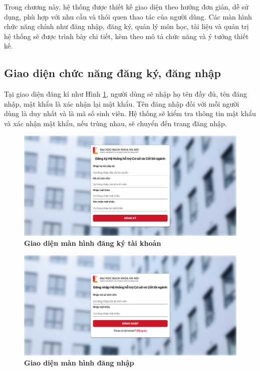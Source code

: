 \documentclass{article}
\begin{document}
	 Trong chương này, hệ thống được thiết kế giao diện theo hướng đơn giản, dễ sử dụng, phù hợp với nhu cầu và thói quen thao tác của người dùng. Các màn hình chức năng chính như đăng nhập, đăng ký, quản lý môn học, tài liệu và quản trị hệ thống sẽ được trình bày chi tiết, kèm theo mô tả chức năng và ý tưởng thiết kế.
	 
	 \subsection{Giao diện chức năng đăng ký, đăng nhập}
	 
	 Tại giao diện đăng kí như Hình \ref{fig41}, người dùng sẽ nhập họ tên đầy đủ, tên đăng nhập, mật khẩu là xác nhận lại mật khẩu. Tên đăng nhập đối với mỗi người dùng là duy nhất và là mã số sinh viên. Hệ thống sẽ kiểm tra thông tin mật khẩu và xác nhận mật khẩu, nếu trùng nhau, sẽ chuyển đến trang đăng nhập.
	 
	 \begin{figure}[!ht]
	 	\centering
	 	\includegraphics[trim= 10pt 10pt 10pt 10pt, clip, width=14cm]{localhost_3000_signin.png}
	 	\caption [Giao diện màn hình đăng ký tài khoản]{\bfseries \fontsize{12pt}{0pt}\selectfont Giao diện màn hình đăng ký tài khoản}
	 	\label{fig41}
	 \end{figure}
	 
	 \begin{figure}[!ht]
	 	\centering
	 	\includegraphics[trim= 10pt 10pt 10pt 10pt, clip, width=14cm]{localhost_3000_login.png}
	 	\caption [Giao diện màn hình đăng nhập]{\bfseries \fontsize{12pt}{0pt}\selectfont Giao diện màn hình đăng nhập}
	 	\label{fig42}
	 \end{figure}
	 
\end{document}

